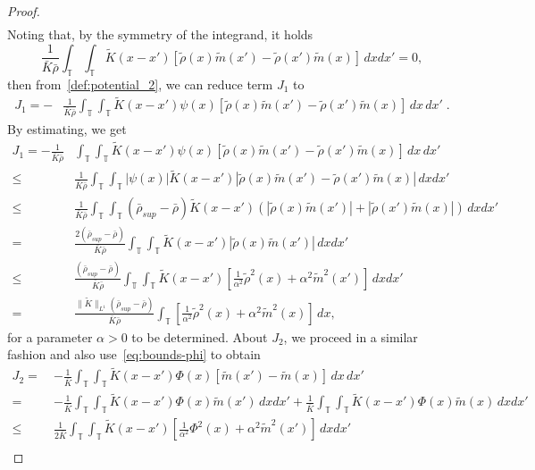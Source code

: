 \documentclass[10pt,a4paper]{amsart}
\newcommand{\bbt} {\mathbb T}
\begin{document}
\begin{proof}
\begin{align*}
\end{align*}
Noting that, by the symmetry of the integrand, it holds
\begin{equation*}
    \frac{1}{\bar K\bar\rho}\int_\bbt\int_\bbt \tilde K(x-x')[\tilde \rho(x)\tilde m(x')-\tilde\rho(x')\tilde m(x)]\,dxdx'=0, 
\end{equation*}
then from~\eqref{def:potential_2}, we can reduce term $J_1$ to
\begin{align*}
J_1=- & \frac{1}{\bar K\bar\rho}\int_\bbt\int_\bbt \tilde K (x-x')\psi(x)[\tilde\rho(x) \tilde m(x')-\tilde\rho(x') \tilde m(x)]\,dx\,dx'\;.
\end{align*}
By estimating, we get 
\begin{align*}
 J_1=   -\frac{1}{\bar K\bar\rho} & \int_\bbt\int_\bbt \tilde K (x-x')\psi(x)[\tilde \rho(x) \tilde m(x')-\tilde \rho(x')\tilde m(x)]\,dx\,dx'\\
    \leq & \frac{1}{\bar K\bar\rho}\int_\bbt\int_\bbt |\psi(x)|\tilde K(x-x')|\tilde\rho(x) \tilde m(x') - \tilde\rho(x') \tilde m(x)|\,dxdx'\\
    \leq & \frac{1}{\bar K\bar\rho}\int_\bbt\int_\bbt (\bar\rho_{sup}-\bar\rho)\tilde  K(x-x')(|\tilde \rho(x) \tilde m(x')|+|\tilde\rho(x') \tilde m(x)|)\,dxdx'\\
    = & \frac{2(\bar\rho_{sup}-\bar\rho)}{\bar K\bar\rho}\int_\bbt\int_\bbt \tilde K(x-x')|\tilde\rho(x) \tilde m(x')|\,dxdx'\\
    \leq & \frac{(\bar\rho_{sup}-\bar\rho)}{\bar K\bar\rho}\int_\bbt\int_\bbt \tilde K(x-x')[\frac{1}{\alpha^2}\tilde\rho^2(x)+\alpha^2 \tilde m^2(x')]\,dxdx'\\
    = & \frac{\|\tilde K\|_{L^1}(\bar\rho_{sup}-\bar\rho)}{\bar K\bar\rho}\int_\bbt[\frac{1}{\alpha^2}\tilde\rho^2(x)+\alpha^2 \tilde m^2(x)]\,dx,
\end{align*}
for a parameter $\alpha>0$ to be determined. About $J_2$, we proceed in a similar fashion and also use~\eqref{eq:bounds-phi} to obtain
\begin{align*}
    J_2 =~&-\frac{1}{\bar K}  \int_\bbt\int_\bbt \tilde K (x-x')\Phi(x)[\tilde m(x') - \tilde m(x)]\,dx\,dx'\\ 
    =~& -\frac{1}{\bar K}\int_\bbt\int_\bbt \tilde K(x-x')\Phi(x)\tilde m(x')\,dxdx'
   + \frac{1}{\bar K}\int_\bbt\int_\bbt \tilde K(x-x')\Phi(x)\tilde m(x)\,dxdx'\\
     \leq ~& \frac{1}{2\bar K}\int_\bbt\int_\bbt \tilde K(x-x')[\frac{1}{\alpha^2}\Phi^2(x)+\alpha^2\tilde m^2(x')]\,dxdx'\\

\end{align*}
\end{proof}
\end{document}
